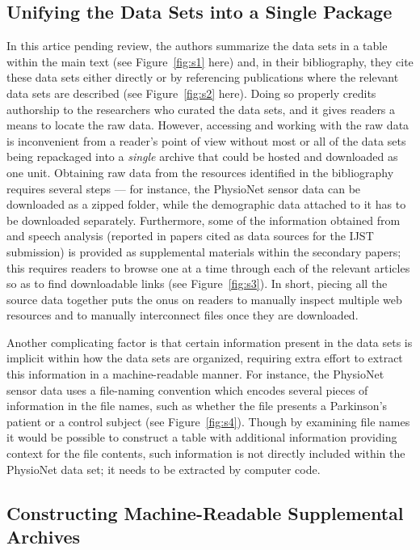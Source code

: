 \documentclass[11pt,letterpaper]{article}
\newcommand{\MRI}{\resizebox{!}{7pt}{\AcronymText{MRI}}}
\newcommand{\textscc}[1]{{\color{orr!35!black}{{%
						\fontfamily{Cabin-TLF}\fontseries{b}\selectfont{\textsc{\scriptsize{#1}}}}}}}
\newcommand{\AcronymText}[1]{{\textscc{#1}}}
\newcommand{\p}[1]{

\vspace{.7em}#1}
\begin{document}
{\subsection{Unifying the Data Sets into a Single Package}  
\p{In this artice pending review, the authors summarize the data sets 
in a table within the main text 
(see Figure~\ref{fig:s1} here) and, in their bibliography, they 
cite these data sets either directly or by 
referencing publications where the relevant data sets are described 
(see Figure~\ref{fig:s2} here).  Doing so properly 
credits authorship to the researchers who curated the data sets, and it gives readers a 
means to locate the raw data.  However, accessing and working with the raw data is 
inconvenient from a reader's point of view without most or all of the data sets being 
repackaged into a \textit{single} archive that could be hosted and downloaded as one unit.  
Obtaining raw data from the resources identified in the bibliography requires 
several steps --- for instance, the PhysioNet sensor data can be downloaded 
as a zipped folder, while the demographic data attached to it has to be downloaded 
separately.  Furthermore, some of the information obtained from \MRI{} and speech analysis 
(reported in papers cited as data sources for the IJST submission) is provided 
as supplemental materials within the secondary papers; this requires readers 
to browse one at a time through each of the relevant articles so as to find 
downloadable links (see Figure~\ref{fig:s3}).  In short, piecing all 
the source data together puts the onus on readers to manually inspect multiple 
web resources and to manually interconnect files once they are downloaded.}

\p{Another complicating factor is that certain information present in the data sets 
is implicit within how the data sets are organized, requiring extra effort to 
extract this information in a machine-readable manner.  For instance, the PhysioNet 
sensor data uses a file-naming convention which encodes several pieces of 
information in the file names, such as whether the file presents a Parkinson's patient 
or a control subject (see Figure~\ref{fig:s4}).  
Though by examining file names it would be possible to construct a 
table with additional information providing context for the file contents, 
such information is not directly included within the PhysioNet data set; it 
needs to be extracted by computer code.}


\subsection{Constructing Machine-Readable Supplemental Archives}

}
\end{document}
